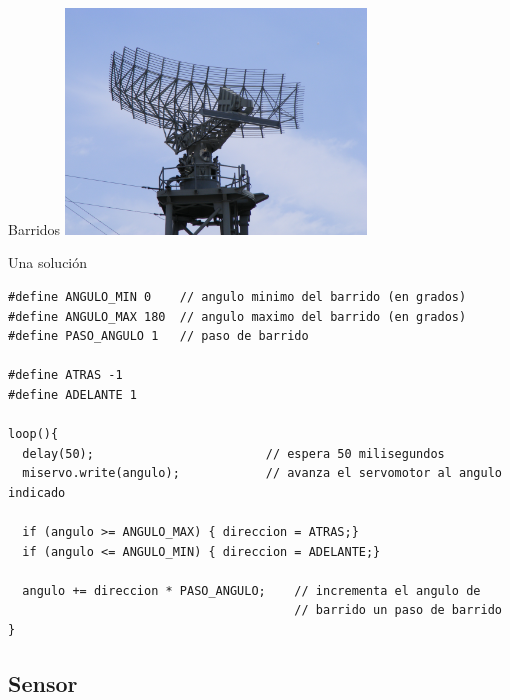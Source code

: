 \begin{frame}{Barridos}
  \includegraphics [width=0.6\textwidth]{radar.jpg}

\end{frame}

\begin{frame}[fragile]{Una solución}
  \begin{lstlisting}
#define ANGULO_MIN 0    // angulo minimo del barrido (en grados)
#define ANGULO_MAX 180  // angulo maximo del barrido (en grados)
#define PASO_ANGULO 1   // paso de barrido 

#define ATRAS -1
#define ADELANTE 1

loop(){
  delay(50);                        // espera 50 milisegundos
  miservo.write(angulo);            // avanza el servomotor al angulo indicado

  if (angulo >= ANGULO_MAX) { direccion = ATRAS;}
  if (angulo <= ANGULO_MIN) { direccion = ADELANTE;}

  angulo += direccion * PASO_ANGULO;    // incrementa el angulo de 
                                        // barrido un paso de barrido
} 
\end{lstlisting}




\end{frame}

\subsection{Sensor}

